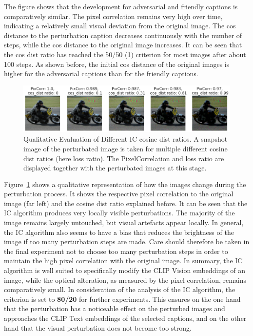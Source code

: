 The figure shows that the development for adversarial and friendly captions is comparatively similar. The pixel correlation remains very high over time, indicating a relatively small visual deviation from the original image. The cos distance to the perturbation caption decreases continuously with the number of steps, while the cos distance to the original image increases. It can be seen that the cos dist ratio has reached the 50/50 (1) criterion for most images after about 100 steps. As shown before, the initial cos distance of the original images is higher for the adversarial captions than for the friendly captions.


\begin{figure}[ht]
    \centering
    \includegraphics[width=1\textwidth]{plots/advpert_ic_qual_validation_evolution.png}
    \caption[Qualitative Evaluation of Different IC cosine dist ratios]{Qualitative Evaluation of Different IC cosine dist ratios. A snapshot image of the perturbated image is taken for multiple different cosine dist ratios (here loss ratio). The PixelCorrelation and loss ratio are displayed together with the perturbated images at this stage.}\label{fig:advpert_ic_qual_validation_evolution}
\end{figure}

Figure~\ref{fig:advpert_ic_qual_validation_evolution} shows a qualitative representation of how the images change during the perturbation process. It shows the respective pixel correlation to the original image (far left) and the cosine dist ratio explained before. It can be seen that the IC algorithm produces very locally visible perturbations. The majority of the image remains largely untouched, but visual artefacts appear locally. In general, the IC algorithm also seems to have a bias that reduces the brightness of the image if too many perturbation steps are made. Care should therefore be taken in the final experiment not to choose too many perturbation steps in order to maintain the high pixel correlation with the original image. In summary, the IC algorithm is well suited to specifically modify the CLIP Vision embeddings of an image, while the optical alteration, as measured by the pixel correlation, remains comparatively small. In consideration of the analysis of the IC algorithm, the criterion is set to \textbf{80/20} for further experiments. This ensures on the one hand that the perturbation has a noticeable effect on the perturbed images and approaches the CLIP Text embeddings of the selected captions, and on the other hand that the visual perturbation does not become too strong. 


